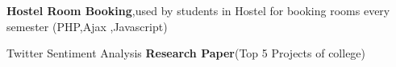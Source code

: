 \begin{cventries}
{\begin{cvitems}
        \item{\textbf{Hostel Room Booking},used by students in Hostel for booking rooms every semester (PHP,Ajax ,Javascript)}
        \item{Twitter Sentiment Analysis \textbf{Research Paper}(Top 5 Projects of college)}
      \end{cvitems} 
    }
\end{cventries}
